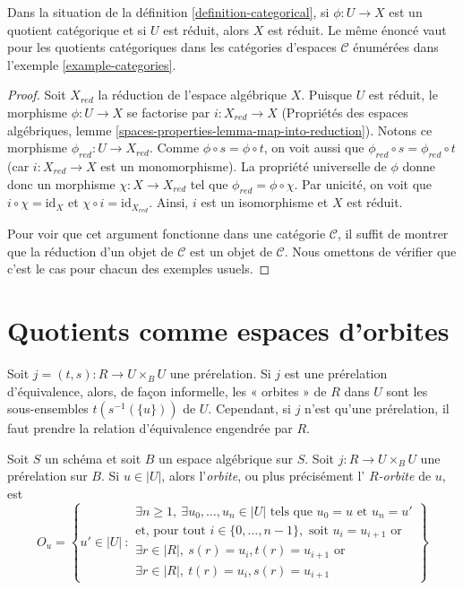 \begin{lemma}
\label{lemma-categorical-reduced}
Dans la situation de la
définition \ref{definition-categorical},
si $\phi : U \to X$ est un quotient catégorique et si $U$ est réduit,
alors $X$ est réduit. Le même énoncé vaut pour les quotients catégoriques dans
les catégories d'espaces $\mathcal{C}$ énumérées dans
l'exemple \ref{example-categories}.
\end{lemma}

\begin{proof}
Soit $X_{red}$ la réduction de l'espace algébrique $X$.
Puisque $U$ est réduit, le morphisme $\phi : U \to X$ se factorise par
$i : X_{red} \to X$ (Propriétés des espaces algébriques, lemme
\ref{spaces-properties-lemma-map-into-reduction}). Notons ce morphisme
$\phi_{red} : U \to X_{red}$. Comme $\phi \circ s = \phi \circ t$, on
voit aussi que $\phi_{red} \circ s = \phi_{red} \circ t$ (car
$i : X_{red} \to X$ est un monomorphisme). La propriété universelle
de $\phi$ donne donc un morphisme $\chi : X \to X_{red}$ tel que
$\phi_{red} = \phi \circ \chi$. Par unicité, on voit que
$i \circ \chi = \text{id}_X$ et $\chi \circ i = \text{id}_{X_{red}}$.
Ainsi, $i$ est un isomorphisme et $X$ est réduit.

\medskip\noindent
Pour voir que cet argument fonctionne dans une catégorie $\mathcal{C}$, il
suffit de montrer que la réduction d'un objet de $\mathcal{C}$
est un objet de $\mathcal{C}$. Nous omettons de vérifier que c'est
le cas pour chacun des exemples usuels.
\end{proof}





\section{Quotients comme espaces d'orbites}
\label{section-orbits}

\noindent
Soit $j = (t, s) : R \to U \times_B U$ une prérelation.
Si $j$ est une prérelation d'équivalence, alors, de façon informelle,
les « orbites » de $R$ dans $U$
sont les sous-ensembles $t(s^{-1}(\{u\}))$ de $U$. Cependant, si $j$ n'est qu'une
prérelation, il faut prendre la relation d'équivalence engendrée
par $R$.

\begin{definition}
\label{definition-orbit}
Soit $S$ un schéma et soit $B$ un espace algébrique sur $S$.
Soit $j : R \to U \times_B U$ une prérelation sur $B$.
Si $u \in |U|$, alors l'{\it orbite}, ou plus précisément l'
{\it $R$-orbite} de $u$, est
$$
O_u =
\left\{
u' \in |U|\ :
\begin{matrix}
\exists n \geq 1, \ \exists u_0, \ldots, u_n \in |U|\text{ tels que }
u_0 = u \text{ et } u_n = u' \\
\text{et, pour tout }i \in \{0, \ldots, n - 1\},\text{ soit }
u_i = u_{i + 1}\text{ or } \\
\exists r \in |R|, \ s(r) = u_i, t(r) = u_{i + 1}
\text{ or } \\
\exists r \in |R|, \ t(r) = u_i, s(r) = u_{i + 1}
\end{matrix}
\right\}
$$
\end{definition}

